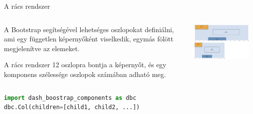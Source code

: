 \documentclass[english, aspectratio=169]{beamer}
\begin{document}
	\begin{frame}[fragile]{A rács rendszer}
		\begin{columns}
			\begin{column}{.5\textwidth}
				A Bootstrap segítségével lehetséges oszlopokat definiálni, ami egy független képernyőként viselkedik, egymás fölött megjelenítve az elemeket.\par\medskip
				A rács rendszer 12 oszlopra bontja a képernyőt, és egy komponens szélessége oszlopok számában adható meg. 
			\end{column}
			\begin{column}{.6\textwidth}
				\begin{center}
					\includegraphics[width=7cm, keepaspectratio]{images/dash_9.png}
				\end{center}
			\end{column}
		\end{columns}
		\vspace{0.2cm}
		\begin{center}
			\begin{lstlisting}[language=python]
import dash_boostrap_components as dbc
dbc.Col(children=[child1, child2, ...])
			\end{lstlisting}
		\end{center}
	\end{frame}
	
\end{document}
